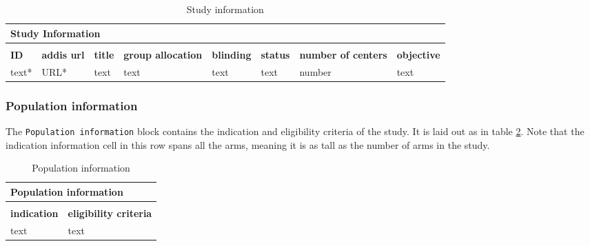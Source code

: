 \documentclass[a4paper,10pt]{article}
\begin{document}
\begin{table}[h!]
  \small
  \centering
  \caption{Study information}
  \label{table:Study Information}
  \begin{tabular}{|l|l|l|l|l|l|l|l|}
    \hline
    \multicolumn{8}{|l|}{Study Information} \\ \hline
    \multicolumn{8}{|l|}{}                  \\ \hline
    \textbf{ID} & \textbf{addis url} & \textbf{title} & \textbf{group allocation} & \textbf{blinding} & \textbf{status} & \textbf{number of centers} & \textbf{objective} \\ \hline
    text* & URL* & text & text & text & text & number & text \\ \hline
  \end{tabular}
\end{table}

\subsubsection{Population information}
The \texttt{Population information} block contains the indication and eligibility criteria of the study. It is laid out as in table \ref{table:Population information}. Note that the indication information cell in this row spans all the arms, meaning it is as tall as the number of arms in the study.
\begin{table}[h!]
  \centering
  \caption{Population information}
  \label{table:Population information}
  \begin{tabular}{|l|l|}
    \hline
    \multicolumn{2}{|l|}{\textbf{Population information}} \\ \hline
    \multicolumn{2}{|l|}{}                                \\ \hline
    \textbf{indication} & \textbf{eligibility criteria}   \\ \hline
    text & text                                           \\ \hline
  \end{tabular}
\end{table}
\end{document}
